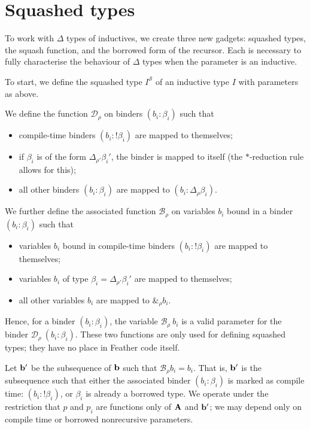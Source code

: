 \section{Squashed types}
To work with \( \Delta \) types of inductives, we create three new gadgets: squashed types, the squash function, and the borrowed form of the recursor.
Each is necessary to fully characterise the behaviour of \( \Delta \) types when the parameter is an inductive.

To start, we define the squashed type \( I^{\mathcal S} \) of an inductive type \( I \) with parameters as above.

\begin{defn}
	We define the function \( \mathcal D_\rho \) on binders \( (b_i : \beta_i) \) such that
	\begin{itemize}
		\item compile-time binders \( (b_i : !\beta_i) \) are mapped to themselves;
		\item if \( \beta_i \) is of the form \( \Delta_{\rho'} \beta_i' \), the binder is mapped to itself (the \( \ast \)-reduction rule allows for this);
		\item all other binders \( (b_i : \beta_i) \) are mapped to \( (b_i : \Delta_{\rho} \beta_i) \).
	\end{itemize}
	We further define the associated function \( \mathcal B_\rho \) on variables \( b_i \) bound in a binder \( (b_i : \beta_i) \) such that
	\begin{itemize}
		\item variables \( b_i \) bound in compile-time binders \( (b_i : !\beta_i) \) are mapped to themselves;
		\item variables \( b_i \) of type \( \beta_i = \Delta_{\rho'} \beta_i' \) are mapped to themselves;
		\item all other variables \( b_i \) are mapped to \( \&_{\rho} b_i \).
	\end{itemize}
	Hence, for a binder \( (b_i : \beta_i) \), the variable \( \mathcal B_\rho\ b_i \) is a valid parameter for the binder \( \mathcal D_\rho\ (b_i : \beta_i) \). These two functions are only used for defining squashed types; they have no place in Feather code itself.
\end{defn}

Let \( \vb b' \) be the subsequence of \( \vb b \) such that \( \mathcal B_\rho b_i = b_i \). That is, \( \vb b' \) is the subsequence such that either the associated binder \( (b_i : \beta_i) \) is marked as compile time: \( (b_i : !\beta_i) \), or \( \beta_i \) is already a borrowed type.
We operate under the restriction that \( p \) and \( p_i \) are functions only of \( \vb A \) and \( \vb b' \); we may depend only on compile time or borrowed nonrecursive parameters.


